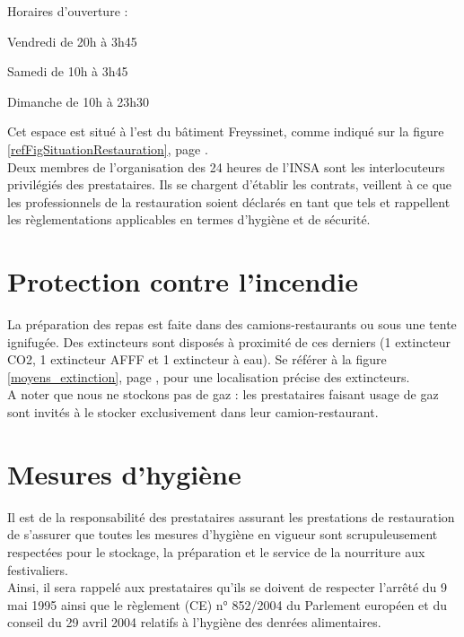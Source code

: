 \documentclass[hidelinks, paper=a4, fontsize=13pt]{report}
\begin{document}
Horaires d’ouverture :
\begin{list}{•}{}
	\item Vendredi de 20h à 3h45
	\item Samedi de 10h à 3h45
	\item Dimanche de 10h à 23h30
	
\end{list}

Cet espace est situé à l'est du bâtiment Freyssinet, comme indiqué sur la figure \ref{refFigSituationRestauration}, page \pageref{refFigSituationRestauration}.\\


Deux membres de l’organisation des 24 heures de l’INSA sont les interlocuteurs privilégiés des prestataires. Ils se chargent d'établir les contrats, veillent à ce que les professionnels de la restauration soient déclarés en tant que tels et rappellent les règlementations applicables en termes d'hygiène et de sécurité.\\

\section{Protection contre l’incendie}

La préparation des repas est faite dans des camions-restaurants ou sous une tente ignifugée. Des extincteurs sont disposés à proximité de ces derniers (1 extincteur CO2, 1 extincteur AFFF et 1 extincteur à eau). Se référer à la figure \ref{moyens_extinction}, page \pageref{moyens_extinction}, pour une localisation précise des extincteurs.\\ 

A noter que nous ne stockons pas de gaz : les prestataires faisant usage de gaz sont invités à le stocker exclusivement dans leur camion-restaurant.

\section{Mesures d’hygiène}

Il est de la responsabilité des prestataires assurant les prestations de restauration de s'assurer que toutes les mesures d'hygiène en vigueur sont scrupuleusement respectées pour le stockage, la préparation et le service de la nourriture aux festivaliers.\\

Ainsi, il sera rappelé aux prestataires qu'ils se doivent de respecter l'arrêté du 9 mai 1995 ainsi que le règlement (CE) n° 852/2004 du Parlement européen et du conseil du 29 avril 2004 relatifs à l'hygiène des denrées alimentaires.\\
\end{document}
